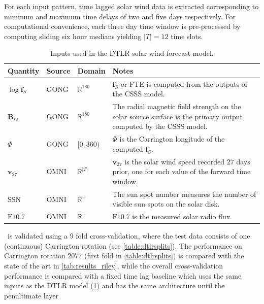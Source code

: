 For each input pattern, time lagged solar wind data is extracted corresponding to minimum and 
maximum time delays of two and five days respectively. For computational convenience, each three 
day time window is pre-processed by computing sliding six hour medians yielding $|T| = 12$ time 
slots.
%
\begin{table}[ht]
    \centering
    \begin{tabular}{l l l p{}}
        \hline
        \textbf{Quantity} & \textbf{Source} & \textbf{Domain} & \textbf{Notes}\\
        \hline
        \vspace{5pt}
          $\log \mathbf{f}_S$ & 
          GONG & 
          $\mathbb{R}^{180}$ & 
          $\mathbf{f}_S$ or FTE is computed from the outputs of the CSSS model.\\
          $\mathbf{B}_{ss}$ & 
          GONG & 
          $\mathbb{R}^{180}$  & 
          The radial magnetic field strength on the solar source surface is the primary output computed by the CSSS model.\\
          $\Phi$ & 
          GONG & 
          $[0, 360)$ & 
          $\Phi$ is the Carrington longitude of the computed $\mathbf{f}_S$.\\
          $\mathbf{v}_{27}$ & 
          OMNI & 
          $\mathbb{R}^{\rvert T \rvert}$ & 
          $\mathbf{v}_{27}$ is the solar wind speed recorded $27$ days prior, one for each value of the forward time window. \\
          $\mathrm{SSN}$ & OMNI & $\mathbb{R}^{+}$ & The sun spot number measures the number of visible sun spots on the solar disk. \\
          $\mathrm{F}10.7$ & OMNI & $\mathbb{R}^{+}$ & $\mathrm{F}10.7$ is the measured solar radio flux. \\
        \hline
    \end{tabular}
    \caption{Inputs used in the DTLR solar wind forecast model.}
    \label{table:dtlrInputs}
\end{table}
%
\XX\ is validated using a $9$ fold cross-validation, where the test data consists of one 
(continuous) Carrington rotation (see \cref{table:dtlrsplits}). The performance on Carrington 
rotation $2077$ (first fold in \cref{table:dtlrsplits}) is compared with the state of the art 
\citep{Riley2011} in \cref{tab:results_riley}, while the overall cross-validation performance 
is compared with a fixed time lag baseline which uses the same inputs as the DTLR model 
(\cref{table:dtlrInputs}) and has the same architecture until the penultimate layer 

